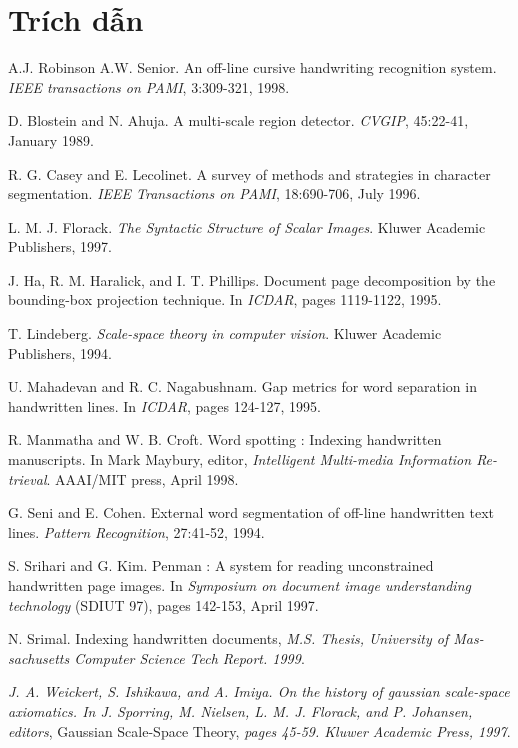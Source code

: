 \documentclass[a4paper]{article}
\begin{document}
\section*{Trích dẫn}
\begin{thebibliography}{9}
    A.J. Robinson A.W. Senior. An off-line cursive handwriting recognition system. \emph{IEEE transactions on PAMI}, 3:309-321, 1998.
    
    D. Blostein and N. Ahuja. A multi-scale region detector. \emph{CVGIP}, 45:22-41, January 1989.

    R. G. Casey and E. Lecolinet. A survey of methods and strategies in character segmentation. \emph{IEEE Transactions on PAMI}, 18:690-706, July 1996.
    
    L. M. J. Florack. \emph{The Syntactic Structure of Scalar Images}. Kluwer Academic Publishers, 1997.

    J. Ha, R. M. Haralick, and I. T. Phillips. Document page decomposition by the bounding-box projection technique. In \emph{ICDAR}, pages 1119-1122, 1995.
    
    T. Lindeberg. \emph{Scale-space theory in computer vision}. Kluwer Academic Publishers, 1994.

    U. Mahadevan and R. C. Nagabushnam. Gap metrics for word separation in handwritten lines. In \emph{ICDAR}, pages 124-127, 1995.
    
    R. Manmatha and W. B. Croft. Word spotting : Indexing handwritten manuscripts. In Mark Maybury, editor, \emph{Intelligent Multi-media Information Re-trieval}. AAAI/MIT press, April 1998.

    G. Seni and E. Cohen. External word segmentation of off-line handwritten text lines. \emph{Pattern Recognition}, 27:41-52, 1994.
    
    S. Srihari and G. Kim. Penman : A system for reading unconstrained handwritten page images. In \emph{Symposium on document image understanding technology} (SDIUT 97), pages 142-153, April 1997.

    N. Srimal. Indexing handwritten documents, \emph{M.S. Thesis, University of Mas-sachusetts Computer Science Tech Report. 1999}.
    
    \emph{J. A. Weickert, S. Ishikawa, and A. Imiya. On the history of gaussian scale-space axiomatics. In J. Sporring, M. Nielsen, L. M. J. Florack, and P. Johansen, editors}, Gaussian Scale-Space Theory, \emph{pages 45-59. Kluwer Academic Press, 1997}. 
    
\end{thebibliography}
\end{document}
